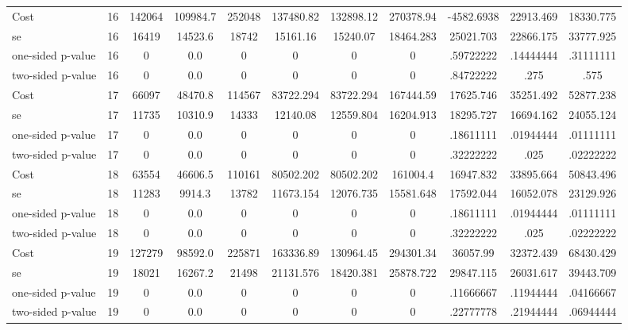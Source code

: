 \begin{tabular}{lcccccccccc}
Cost 			  &        16 &    142064 &  109984.7 &    252048 & 137480.82 & 132898.12 & 270378.94 & -4582.6938 & 22913.469 & 18330.775 \\  
se 				 &        16 &     16419 &   14523.6 &     18742 & 15161.16 & 15240.07 & 18464.283 & 25021.703 & 22866.175 & 33777.925 \\  
one-sided p-value&        16 &         0 &       0.0 &         0 & 0 & 0 & 0 & .59722222 & .14444444 & .31111111 \\  
two-sided p-value&        16 &         0 &       0.0 &         0 & 0 & 0 & 0 & .84722222 & .275 & .575 \\  
Cost 			  &        17 &     66097 &   48470.8 &    114567 & 83722.294 & 83722.294 & 167444.59 & 17625.746 & 35251.492 & 52877.238 \\  
se 				  &        17 &     11735 &   10310.9 &     14333 & 12140.08 & 12559.804 & 16204.913 & 18295.727 & 16694.162 & 24055.124 \\  
one-sided p-value &        17 &         0 &       0.0 &         0 & 0 & 0 & 0 & .18611111 & .01944444 & .01111111 \\  
two-sided p-value &        17 &         0 &       0.0 &         0 & 0 & 0 & 0 & .32222222 & .025 & .02222222 \\  
Cost 			  &        18 &     63554 &   46606.5 &    110161 & 80502.202 & 80502.202 & 161004.4 & 16947.832 & 33895.664 & 50843.496 \\  
se 				 &        18 &     11283 &    9914.3 &     13782 & 11673.154 & 12076.735 & 15581.648 & 17592.044 & 16052.078 & 23129.926 \\  
one-sided p-value&        18 &         0 &       0.0 &         0 & 0 & 0 & 0 & .18611111 & .01944444 & .01111111 \\  
two-sided p-value&        18 &         0 &       0.0 &         0 & 0 & 0 & 0 & .32222222 & .025 & .02222222 \\  
Cost 			  &        19 &    127279 &   98592.0 &    225871 & 163336.89 & 130964.45 & 294301.34 & 36057.99 & 32372.439 & 68430.429 \\  
se 				 &        19 &     18021 &   16267.2 &     21498 & 21131.576 & 18420.381 & 25878.722 & 29847.115 & 26031.617 & 39443.709 \\  
one-sided p-value&        19 &         0 &       0.0 &         0 & 0 & 0 & 0 & .11666667 & .11944444 & .04166667 \\  
two-sided p-value&        19 &         0 &       0.0 &         0 & 0 & 0 & 0 & .22777778 & .21944444 & .06944444 \\  

\end{tabular}
